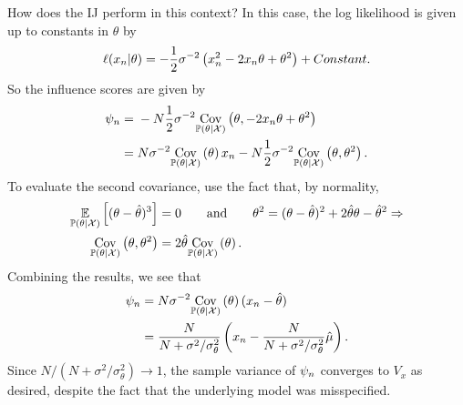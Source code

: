 How does the IJ perform in this context?  In this case, the log likelihood is
given up to constants in $\theta$ by
%
\begin{align*}
%
\ell(\x_n \vert \theta) =
    -\frac{1}{2} \sigma^{-2} \left(\x_n^2 - 2 \x_n \theta + \theta^2\right) +
    Constant.
%
\end{align*}
%
So the influence scores are given by
%
\begin{align*}
%
\infl_n ={}&
    -N \frac{1}{2} \sigma^{-2} \cov{\post}{\theta, - 2 \x_n \theta + \theta^2} \\
={}& N \sigma^{-2} \cov{\post}{\theta} \x_n -
    N \frac{1}{2} \sigma^{-2} \cov{\post}{\theta, \theta^2}.
%
\end{align*}
%
To evaluate the second covariance, use the fact that, by normality,
%
\begin{align*}
%
\expect{\post}{(\theta - \hat\theta)^3} ={}& 0 \quad\quad\textrm{and}\quad\quad
\theta^2 = (\theta - \hat\theta)^2 + 2 \hat\theta \theta - \hat\theta^2 \Rightarrow\\
\cov{\post}{\theta, \theta^2} ={}& 2 \hat\theta \cov{\post}{\theta}.
%
\end{align*}
%
Combining the results, we see that
%
\begin{align*}
%
\infl_n ={}& N \sigma^{-2} \cov{\post}{\theta} (\x_n - \hat\theta)\\
={}& \frac{N}{N + \sigma^2 / \sigma_\theta^2}
    \left(\x_n - \frac{N}{N + \sigma^2 / \sigma_\theta^2} \hat{\mu}\right).
%
\end{align*}
%
Since $N / (N + \sigma^2 / \sigma_\theta^2) \rightarrow 1$, the sample variance
of $\psi_n$ converges to $V_x$ as desired, despite the fact that the underlying
model was misspecified.
